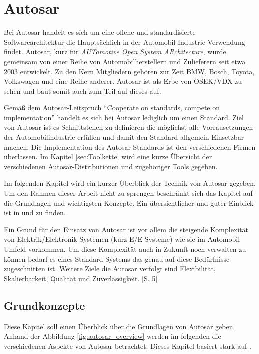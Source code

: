 \documentclass[
  a4paper,					    %
  twoside,
  DIV=calc,     				%
  bibliography=totoc,
  cleardoublepage=empty,
  ngerman,     					%
  final       					%
]{scrbook}
\begin{document}
\section{Autosar}
\label{sec:Autosar}
Bei Autosar handelt es sich um eine offene und standardisierte Softwarearchitektur die Hauptsächlich in der Automobil-Industrie Verwendung findet. Autosar, kurz für \emph{AUTomotive Open System ARchitecture}, wurde gemeinsam von einer Reihe von Automobilherstellern und Zulieferern seit etwa 2003 entwickelt. Zu den Kern Mitgliedern gehören zur Zeit BMW, Bosch, Toyota, Volkswagen und eine Reihe anderer. Autosar ist als Erbe von OSEK/VDX zu sehen und baut somit auch zum Teil auf dieses auf.

Gemäß dem Autosar-Leitspruch "`Cooperate on standards, compete on implementation"' handelt es sich bei Autosar lediglich um einen Standard. Ziel von Autosar ist es Schnittstellen zu definieren die möglichst alle Vorrausetzungen der Automobilindustrie erfüllen und damit den Standard allgemein Einsetzbar machen. Die Implementation des Autosar-Standards ist den verschiedenen Firmen überlassen. Im Kapitel \ref{sec:Toolkette} wird eine kurze Übersicht der verschiedenen Autosar-Distributionen und zugehöriger Tools gegeben.

Im folgenden Kapitel wird ein kurzer Überblick der Technik von Autosar gegeben. Um den Rahmen dieser Arbeit nicht zu sprengen beschränkt sich das Kapitel auf die Grundlagen und wichtigsten Konzepte. Ein übersichtlicher und guter Einblick ist in \cite{autosar_techoverview} und \cite{autosar_layer} zu finden.

Ein Grund für den Einsatz von Autosar ist vor allem die steigende Komplexität von Elektrik/Elektronik Systemen (kurz E/E Systeme) wie sie im Automobil Umfeld vorkommen. Um diese Komplexität auch in Zukunft noch verwalten zu können bedarf es eines Standard-Systems das genau auf diese Bedürfnisse zugeschnitten ist. Weitere Ziele die Autosar verfolgt sind Flexibilität, Skalierbarkeit, Qualität und Zuverlässigkeit. \cite{autosar_techoverview}[S. 5]



\subsection{Grundkonzepte}
\label{sec:Grundkonzepte}
Diese Kapitel soll einen Überblick über die Grundlagen von Autosar geben. Anhand der Abbildung \ref{fig:autosar_overview} werden im folgenden die verschiedenen Aspekte von Autosar betrachtet. Dieses Kapitel basiert stark auf \cite{autosar_techoverview}.
\end{document}

